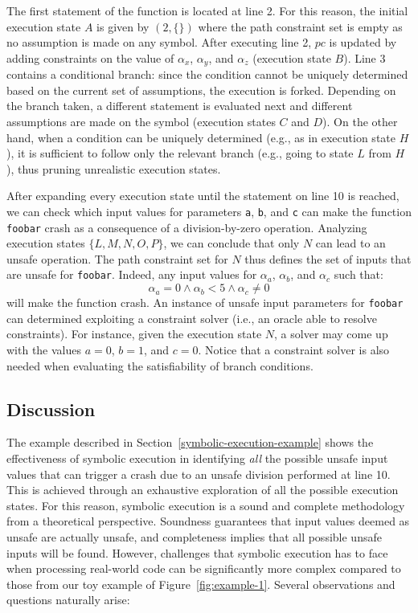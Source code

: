 The first statement of the function is located at line 2. For this reason, the initial execution state $A$ is given by $(2, \{\})$ where the path constraint set is empty as no assumption is made on any symbol. After executing line 2,  $pc$ is updated by adding constraints on the value of $\alpha_x$, $\alpha_y$, and $\alpha_z$ (execution state $B$). Line 3 contains a conditional branch: since the condition cannot be uniquely determined based on the current set of assumptions, the execution is forked. Depending on the branch taken, a different statement is evaluated next and different assumptions are made on the symbol (execution states $C$ and $D$). On the other hand, when a condition can be uniquely determined (e.g., as in execution state $H$), it is sufficient to follow only the relevant branch (e.g., going to state $L$ from $H$), thus pruning unrealistic execution states. 

After expanding every execution state until the statement on line 10 is reached, we can check which input values for parameters {\tt a}, {\tt b}, and {\tt c} can make the function {\tt foobar} crash as a consequence of a division-by-zero operation. Analyzing execution states $\{L, M, N, O, P\}$, we can conclude that only $N$ can lead to an unsafe operation. The path constraint set for $N$ thus defines the set of inputs that are unsafe for {\tt foobar}. Indeed, any input values for $\alpha_a$, $\alpha_b$, and $\alpha_c$ such that:
 \[ \alpha_a = 0 \wedge \alpha_b < 5 \wedge \alpha_c \neq 0 \]
will make the function crash. An instance of unsafe input parameters for {\tt foobar} can determined exploiting a constraint solver (i.e., an oracle able to resolve constraints). For instance, given the execution state $N$, a solver may come up with the values $a = 0$, $b = 1$, and $c = 0$. Notice that a constraint solver is also needed when evaluating the satisfiability of branch conditions.

\subsection{Discussion}
\label{example-discussion}

The example described in Section~\ref{symbolic-execution-example} shows the effectiveness of symbolic execution in identifying {\em all} the possible unsafe input values that can trigger a crash due to an unsafe division performed at line 10. This is achieved through an exhaustive exploration of all the possible execution states. For this reason, symbolic execution is a sound and complete methodology from a theoretical perspective. Soundness guarantees that input values deemed as unsafe are actually unsafe, and completeness implies that all possible unsafe inputs will be found. However, challenges that symbolic execution has to face when processing real-world code can be significantly more complex compared to those from our toy example of Figure~\ref{fig:example-1}. Several observations and questions naturally arise:

